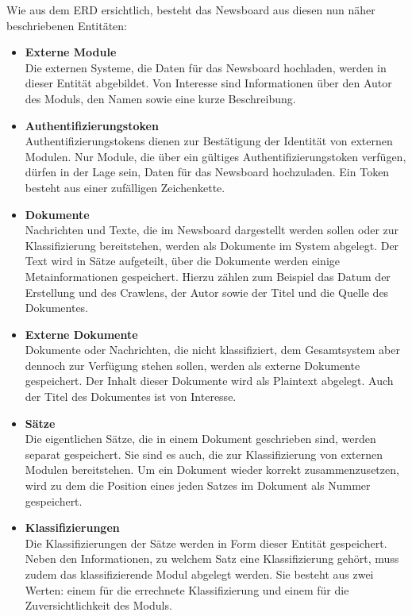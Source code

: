 \newpage
Wie aus dem ERD ersichtlich, besteht das Newsboard aus diesen nun näher beschriebenen 
Entitäten:
\begin{itemize}
	\item \textbf{Externe Module}\\
	Die externen Systeme, die Daten für das Newsboard hochladen, werden in dieser Entität
	abgebildet. Von Interesse sind Informationen über den Autor des Moduls,
	den Namen sowie eine kurze Beschreibung.
	\item \textbf{Authentifizierungstoken}\\
	Authentifizierungstokens dienen zur Bestätigung der Identität von externen Modulen.
	Nur Module, die über ein gültiges Authentifizierungstoken verfügen, dürfen in der Lage
	sein, Daten für das Newsboard hochzuladen. Ein Token besteht aus einer zufälligen
	Zeichenkette.
	\item \textbf{Dokumente}\\
	Nachrichten und Texte, die im Newsboard dargestellt werden sollen oder zur
	Klassifizierung bereitstehen, werden als Dokumente im System abgelegt. Der Text wird in
	Sätze aufgeteilt, über die Dokumente werden einige Metainformationen gespeichert. Hierzu
	zählen zum Beispiel das Datum der Erstellung und des Crawlens, der Autor sowie der Titel
	und die Quelle des Dokumentes.
	\item \textbf{Externe Dokumente}\\
	Dokumente oder Nachrichten, die nicht klassifiziert, dem Gesamtsystem aber dennoch zur
	Verfügung stehen sollen, werden als externe Dokumente gespeichert. Der Inhalt dieser
	Dokumente wird als Plaintext abgelegt. Auch der Titel des Dokumentes ist von Interesse.
	\item \textbf{Sätze}\\
	Die eigentlichen Sätze, die in einem Dokument geschrieben sind, werden separat 
	gespeichert. Sie sind es auch, die zur Klassifizierung von externen Modulen 
	bereitstehen. Um ein Dokument wieder korrekt zusammenzusetzen, wird zu dem die 
	Position eines jeden Satzes im Dokument als Nummer gespeichert.
	\item \textbf{Klassifizierungen}\\
	Die Klassifizierungen der Sätze werden in Form dieser Entität gespeichert. Neben den 
	Informationen, zu welchem Satz eine Klassifizierung gehört, muss zudem das 
	klassifizierende Modul abgelegt werden. Sie besteht aus zwei
	Werten: einem für die errechnete Klassifizierung und einem für die Zuversichtlichkeit
	des Moduls. 
\end{itemize}

